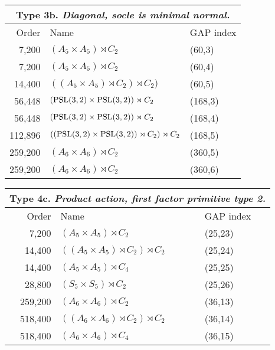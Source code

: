 {\vskip1cm

  \begin{tabular}{r|l|l}
  \multicolumn{3}{c}{Type 3b. \emph{Diagonal, socle is minimal normal.}}\\\toprule
    Order & Name & GAP index \\
\midrule
 7,200 & $(A_5 \times A_5) \rtimes C_2$ & (60,3) \\
 7,200 & $(A_5 \times A_5) \rtimes C_2$ & (60,4) \\
 14,400 & $((A_5 \times A_5) \rtimes C_2) \rtimes C_2)$ & (60,5) \\
 56,448 & $(\mathrm{PSL}(3,2) \times \mathrm{PSL}(3,2)) \rtimes C_2$ & (168,3) \\
 56,448 & $(\mathrm{PSL}(3,2) \times \mathrm{PSL}(3,2)) \rtimes C_2$ & (168,4) \\
 112,896 & $((\mathrm{PSL}(3,2) \times \mathrm{PSL}(3,2)) \rtimes C_2) \rtimes C_2$ & (168,5) \\
 259,200 & $(A_6 \times A_6) \rtimes C_2$ & (360,5) \\
 259,200 & $(A_6 \times A_6) \rtimes C_2$ & (360,6)\\
\end{tabular}

\vskip1cm

  \begin{tabular}{r|l|l}
  \multicolumn{3}{c}{Type 4c. \emph{Product action, first factor primitive type 2.}}\\\toprule
    Order & Name & GAP index \\
\midrule
 7,200 & $(A_5 \times A_5) \rtimes C_2$ & (25,23) \\
 14,400 & $((A_5 \times A_5) \rtimes C_2) \rtimes C_2$ & (25,24) \\
 14,400 & $(A_5 \times A_5) \rtimes C_4$ & (25,25) \\
 28,800 & $(S_5 \times S_5) \rtimes C_2$ & (25,26) \\
 259,200 & $(A_6 \times A_6) \rtimes C_2$ & (36,13) \\
 518,400 & $((A_6 \times A_6) \rtimes C_2) \rtimes C_2$ & (36,14) \\
 518,400 & $(A_6 \times A_6) \rtimes C_4$ & (36,15)\\
\end{tabular}
}


